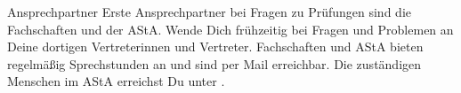 \begin{artikel}{Ansprechpartner}
Erste Ansprechpartner bei Fragen zu Prüfungen sind die Fachschaften und der AStA. Wende Dich frühzeitig bei Fragen und Problemen an Deine dortigen Vertreterinnen und Vertreter. Fachschaften und AStA bieten regelmäßig Sprechstunden an und sind per Mail erreichbar. Die zuständigen Menschen im AStA erreichst Du unter .
\end{artikel}
